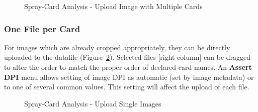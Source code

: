 \documentclass[10pt,letterpaper,titlepage]{article}
\begin{document}
    \begin{figure}[hb]
        \centering
        \caption{Spray-Card Analysis - Upload Image with Multiple Cards}
        \label{fig:card_upload_multiple}
    \end{figure}
    \FloatBarrier

    \subsubsection{One File per Card}
    For images which are already cropped appropriately, they can be directly uploaded to the datafile (Figure~\ref{fig:card_upload_singles}). Selected files [right column] can be dragged to alter the order to match the proper order of declared card names. An \textbf{Assert DPI} menu allows setting of image DPI as automatic (set by image metadata) or to one of several common values. This setting will affect the upload of each file.
    \begin{figure}[hb]
        \centering
        \caption{Spray-Card Analysis - Upload Single Images}
        \label{fig:card_upload_singles}
    \end{figure}
    \FloatBarrier
\end{document}

